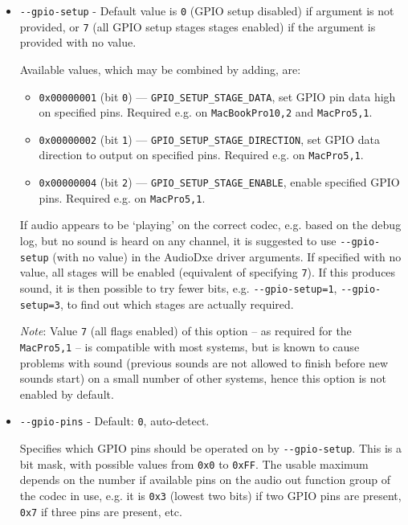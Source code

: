 \documentclass[]{article}
\providecommand{\tightlist}{%
  \setlength{\itemsep}{0pt}\setlength{\parskip}{0pt}}
\begin{document}
\begin{itemize}
  \tightlist
	\item \texttt{-{}-gpio-setup} - Default value is \texttt{0} (GPIO setup disabled) if argument is not provided,
  or \texttt{7} (all GPIO setup stages stages enabled) if the argument is provided with no value. \medskip

	Available values, which may be combined by adding, are: \medskip

  \begin{itemize}
  \tightlist
    \item \texttt{0x00000001} (bit \texttt{0}) --- \texttt{GPIO\_SETUP\_STAGE\_DATA},
    set GPIO pin data high on specified pins. Required e.g. on \texttt{MacBookPro10,2} and \texttt{MacPro5,1}.
    \item \texttt{0x00000002} (bit \texttt{1}) --- \texttt{GPIO\_SETUP\_STAGE\_DIRECTION},
    set GPIO data direction to output on specified pins. Required e.g. on \texttt{MacPro5,1}.
    \item \texttt{0x00000004} (bit \texttt{2}) --- \texttt{GPIO\_SETUP\_STAGE\_ENABLE},
    enable specified GPIO pins. Required e.g. on \texttt{MacPro5,1}.
  \end{itemize} \medskip

  If audio appears to be `playing' on the correct codec, e.g. based on the debug log, but no
  sound is heard on any channel, it is suggested to use \texttt{-{}-gpio-setup} (with no
  value) in the AudioDxe driver arguments. If specified with no value, all
  stages will be enabled (equivalent of specifying \texttt{7}). If this produces sound,
  it is then possible to try fewer bits, e.g. \texttt{-{}-gpio-setup=1}, \texttt{-{}-gpio-setup=3},
  to find out which stages are actually required. \medskip

  \emph{Note}: Value \texttt{7} (all flags enabled) of this option -- as required for the
  \texttt{MacPro5,1} -- is compatible with most systems, but is known to cause problems with
  sound (previous sounds are not allowed to finish before new sounds start) on a small number
  of other systems, hence this option is not enabled by default. \medskip

	\item \texttt{-{}-gpio-pins} - Default: \texttt{0}, auto-detect. \medskip

	Specifies which GPIO pins should be operated on by \texttt{-{}-gpio-setup}. This is a bit mask,
  with possible values from \texttt{0x0} to \texttt{0xFF}. The usable maximum depends on
  the number if available pins on the audio out function group of the codec in use, e.g. it is
  \texttt{0x3} (lowest two bits) if two GPIO pins are present, \texttt{0x7} if three pins are present,
  etc. \medskip


\end{itemize}
\end{document}
